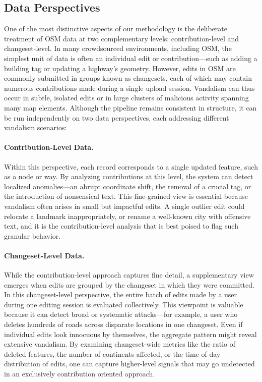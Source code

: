 \documentclass[
    13pt, %
    a4paper, %
    DIV14, %
    listof=totoc, %
    bibliography=totoc, %
    index=totoc, %
    headsepline
]{scrreprt}
\begin{document}
\subsection{Data Perspectives}
\label{sec:data_perspectives}

\noindent
One of the most distinctive aspects of our methodology is the deliberate treatment of OSM data
at two complementary levels: contribution-level and changeset-level. In many crowdsourced
environments, including OSM, the simplest unit of data is often an individual edit or contribution—such as adding a building tag or updating a highway’s geometry. However, edits in OSM
are commonly submitted in groups known as changesets, each of which may contain numerous
contributions made during a single upload session. Vandalism can thus occur in subtle, isolated
edits or in large clusters of malicious activity spanning many map elements. Although the pipeline remains consistent in structure, it can be run independently on two data perspectives, each addressing different vandalism scenarios:

\paragraph{Contribution-Level Data.}
Within this perspective, each record corresponds to a single updated feature, such as a node or way. By analyzing contributions at this level, the system can detect localized anomalies—an abrupt coordinate shift, the removal of a crucial tag, or the introduction of nonsensical text. This fine-grained view is essential because vandalism often arises in small but impactful edits. A single outlier edit could relocate a landmark inappropriately, or rename a  well-known city with offensive text, and it is the contribution-level analysis that is best poised to flag such granular behavior.

\paragraph{Changeset-Level Data.}
While the contribution-level approach captures fine detail,
a supplementary view emerges when edits are grouped by the changeset in which they were
committed. In this changeset-level perspective, the entire batch of edits made by a user during
one editing session is evaluated collectively. This viewpoint is valuable because it can detect
broad or systematic attacks—for example, a user who deletes hundreds of roads across disparate
locations in one changeset. Even if individual edits look innocuous by themselves, the aggregate
pattern might reveal extensive vandalism. By examining changeset-wide metrics like the ratio
of deleted features, the number of continents affected, or the time-of-day distribution of edits,
one can capture higher-level signals that may go undetected in an exclusively contribution oriented approach.
\end{document}
